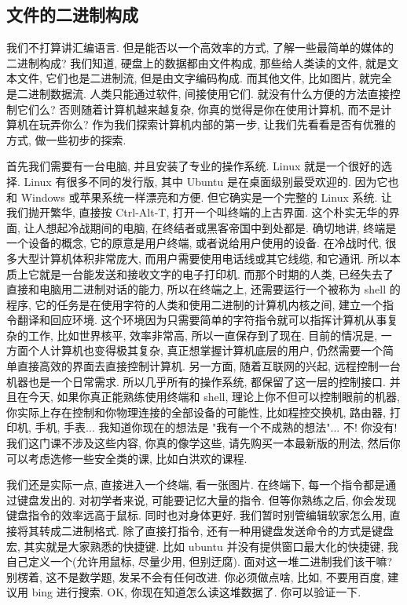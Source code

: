 \documentclass[a4paper]{ctexart}
\begin{document}
\subsection{文件的二进制构成}
我们不打算讲汇编语言. 但是能否以一个高效率的方式, 了解一些最简单的媒体的二进制构成? 我们知道,
硬盘上的数据都由文件构成, 那些给人类读的文件, 就是文本文件, 它们也是二进制流, 但是由文字编码构成.
而其他文件, 比如图片, 就完全是二进制数据流. 人类只能通过软件, 间接使用它们.
就没有什么方便的方法直接控制它们么? 否则随着计算机越来越复杂, 你真的觉得是你在使用计算机,
而不是计算机在玩弄你么? 作为我们探索计算机内部的第一步, 让我们先看看是否有优雅的方式,
做一些初步的探索.

首先我们需要有一台电脑, 并且安装了专业的操作系统. Linux 就是一个很好的选择. Linux 有很多不同的发行版,
其中 Ubuntu 是在桌面级别最受欢迎的. 因为它也和 Windows 或苹果系统一样漂亮和方便.
但它确实是一个完整的 Linux 系统. 让我们抛开繁华, 直接按 Ctrl-Alt-T, 打开一个叫终端的上古界面.
这个朴实无华的界面, 让人想起冷战期间的电脑, 在终结者或黑客帝国中到处都是. 确切地讲, 终端是一个设备的概念,
它的原意是用户终端, 或者说给用户使用的设备. 在冷战时代, 很多大型计算机体积非常庞大,
而用户需要使用电话线或其它线缆, 和它通讯. 所以本质上它就是一台能发送和接收文字的电子打印机. 而那个时期的人类,
已经失去了直接和电脑用二进制对话的能力, 所以在终端之上, 还需要运行一个被称为 shell 的程序,
它的任务是在使用字符的人类和使用二进制的计算机内核之间, 建立一个指令翻译和回应环境.
这个环境因为只需要简单的字符指令就可以指挥计算机从事复杂的工作, 比如世界核平, 效率非常高, 所以一直保存到了现在.
目前的情况是, 一方面个人计算机也变得极其复杂, 真正想掌握计算机底层的用户,
仍然需要一个简单直接高效的界面去直接控制计算机. 另一方面, 随着互联网的兴起, 远程控制一台机器也是一个日常需求.
所以几乎所有的操作系统, 都保留了这一层的控制接口. 并且在今天, 如果你真正能熟练使用终端和 shell,
理论上你不但可以控制眼前的机器, 你实际上存在控制和你物理连接的全部设备的可能性, 比如程控交换机, 路由器,
打印机, 手机, 手表... 我知道你现在的想法是 "我有一个不成熟的想法"... 不! 你没有! 我们这门课不涉及这些内容,
你真的像学这些, 请先购买一本最新版的刑法, 然后你可以考虑选修一些安全类的课, 比如白洪欢的课程.

我们还是实际一点, 直接进入一个终端, 看一张图片. 在终端下, 每一个指令都是通过键盘发出的. 对初学者来说,
可能要记忆大量的指令. 但等你熟练之后, 你会发现键盘指令的效率远高于鼠标. 同时也对身体更好.
我们暂时别管编辑软家怎么用, 直接将其转成二进制格式. 除了直接打指令, 还有一种用键盘发送命令的方式是键盘宏,
其实就是大家熟悉的快捷键. 比如 ubuntu 并没有提供窗口最大化的快捷键, 我自己定义一个(允许用鼠标, 尽量少用,
但别迂腐). 面对这一堆二进制我们该干嘛? 别楞着, 这不是数学题, 发呆不会有任何改进. 你必须做点啥, 比如,
不要用百度, 建议用 bing 进行搜索. OK, 你现在知道怎么读这堆数据了. 你可以验证一下. 
\end{document}
